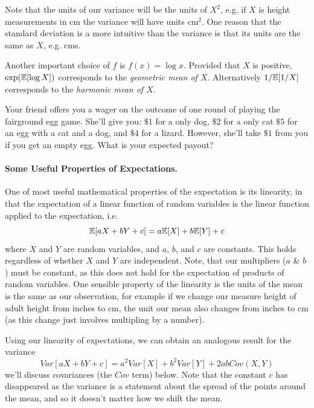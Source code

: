 Note that the units of our variance will be the units of $X^2$,
e.g. if $X$ is height measurements in cm the variance will have units
cm$^2$. One reason that the standard deviation is a more intuitive
than the variance is that its units are the same as $X$, e.g.  cms. 

Another important choice of $f$ is $f(x)=\log x$. Provided that $X$ is positive, $\exp(\mathbb{E}[\log X])$ corresponds to the  \emph{geometric mean of $X$}. Alternatively $1/\mathbb{E}[1/X]$ corresponds to the \emph{harmonic mean of $X$}. 


\begin{question}{}
Your friend offers you a wager on the outcome of one round of playing the
fairground egg game. She'll give you: $\$1$ for a only dog, $\$2$ for
a only cat
$\$5$ for an egg with a cat and a dog, and $\$4$ for a
lizard. However, she'll take $\$1$ from you if you get an empty
egg. What is your expected payout?
  \end{question}

\paragraph{Some Useful Properties of Expectations.}
One of most useful mathematical properties of the expectation is its
linearity, in that the expectation of a linear function of random
variables is the linear function applied to the expectation, i.e. 
\begin{equation}
\mathbb{E}[aX+bY+c]= a\mathbb{E}[X] + b \mathbb{E}[Y] +c \label{eqn:linearity_expectation}
\end{equation}
where $X$ and $Y$ are random variables, and $a$, $b$, and $c$ are
constants. This holds regardless of whether $X$ and $Y$ are
independent. Note, that our multipliers ($a$ \& $b$) must be constant, as
this does not hold for the expectation of products of random
variables. One sensible property of the linearity is the units of the
mean is the same as our observation, for example if we change our measure height
of adult height from inches to cm, the unit our mean also changes from
inches to cm (as this change just involves multipling by a number). 

Using our linearity of expectations, we can obtain an analogous result for the variance
\begin{equation}
Var[aX+bY+c]= a^2Var[X] + b^2 Var[Y]  + 2ab Cov(X,Y) \label{eqn:general_var_decomp}
\end{equation}
we'll discuss covariances (the $Cov$ term) below. Note that the constant $c$
has disappeared as the variance is a statement about the spread of the
points around the mean, and so it doesn't matter how we shift the
mean. 

